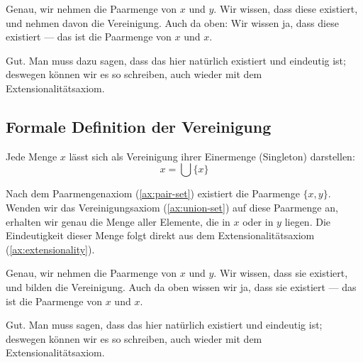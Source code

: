 \begin{spoken-clean}[continued]
Genau, wir nehmen die Paarmenge von $x$ und $y$. Wir wissen, dass diese existiert, und nehmen davon die Vereinigung. Auch da oben: Wir wissen ja, dass diese existiert --- das ist die Paarmenge von $x$ und $x$.

Gut. Man muss dazu sagen, dass das hier natürlich existiert und eindeutig ist; deswegen können wir es so schreiben, auch wieder mit dem Extensionalitätsaxiom.
\end{spoken-clean}

\subsection{Formale Definition der Vereinigung}
\begin{math-stroke}

\begin{example}
Jede Menge $x$ lässt sich als Vereinigung ihrer Einermenge (Singleton) darstellen:
\[
x = \bigcup \{x\}
\]
\end{example}

\begin{explanation-of-steps}
Nach dem Paarmengenaxiom (\cref{ax:pair-set}) existiert die Paarmenge $\{x, y\}$. Wenden wir das Vereinigungsaxiom (\cref{ax:union-set}) auf diese Paarmenge an, erhalten wir genau die Menge aller Elemente, die in $x$ oder in $y$ liegen. Die Eindeutigkeit dieser Menge folgt direkt aus dem Extensionalitätsaxiom (\cref{ax:extensionality}).
\end{explanation-of-steps}
\end{math-stroke}

\begin{spoken-clean}[00:17:17 - 00:20:01]
Genau, wir nehmen die Paarmenge von $x$ und $y$. Wir wissen, dass sie existiert, und bilden die Vereinigung. Auch da oben wissen wir ja, dass sie existiert --- das ist die Paarmenge von $x$ und $x$.

Gut. Man muss sagen, dass das hier natürlich existiert und eindeutig ist; deswegen können wir es so schreiben, auch wieder mit dem Extensionalitätsaxiom.
\end{spoken-clean}


